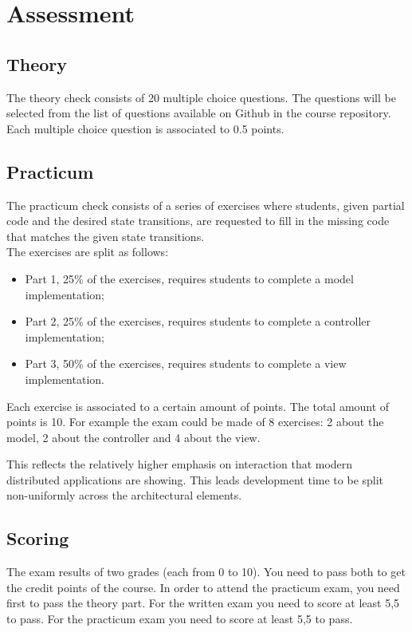 \section{Assessment}

\subsection*{Theory}
The theory check consists of 20 multiple choice questions. The questions will be selected from the list of questions available on Github in the course repository. Each multiple choice question is associated to 0.5 points. 
 
\subsection*{Practicum}
The practicum check consists of a series of exercises where students, given partial
code and the desired state transitions, are requested to fill in the
missing code that matches the given state transitions.
\\
The exercises are split as follows: 
\begin{itemize}
\item Part 1, 25\% of the exercises, requires students to complete a model implementation; 
\item Part 2, 25\% of the exercises, requires students to complete a controller implementation; 
\item Part 3, 50\% of the exercises, requires students to complete a view implementation.
\end{itemize}
Each exercise is associated to a certain amount of points. The total amount of points is 10.
For example the exam could be made of 8 exercises: 2 about the model, 2
about the controller and 4 about the view.

This reflects the relatively higher emphasis on interaction that modern
distributed applications are showing. This leads development time to be
split non-uniformly across the architectural elements.

\subsection*{Scoring}

The exam results of two grades (each from 0 to 10). You need to pass both to get the credit points of the course. In order to attend the practicum exam, you need first to pass the theory part.
For the written exam you need to score at least 5,5 to pass. 
For the practicum exam you need to score at least 5,5 to pass.  



